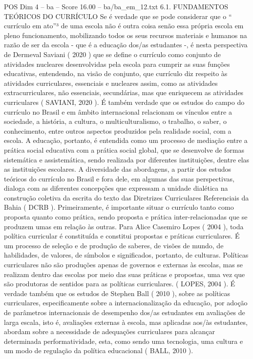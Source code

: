 \begin{textsample}{POS Dim 4 – ba – Score 16.00 – ba/ba\_em\_12.txt}  \label{ex:f4_pos_026}
6.1.
FUNDAMENTOS TEÓRICOS DO CURRÍCULO Se é verdade que se pode considerar que o “ currículo em ato”³ de uma escola não é outra coisa senão essa própria escola em pleno funcionamento, mobilizando todos os seus recursos materiais e humanos na razão de ser da escola - que é a educação dos/as estudantes -, é nesta perspectiva de Dermeval Saviani ( 2020 ) que se define o currículo como conjunto de atividades nucleares desenvolvidas pela escola para cumprir as suas funções educativas, entendendo, na visão de conjunto, que currículo diz respeito às atividades curriculares, essenciais e nucleares assim, como as atividades extracurriculares, não essenciais, secundárias, mas que enriquecem as atividades curriculares ( SAVIANI, 2020 ).
É também verdade que os estudos do campo do currículo no Brasil e em âmbito internacional relacionam os vínculos entre a sociedade, a história, a cultura, o multiculturalismo, o trabalho, o saber, o conhecimento, entre outros aspectos produzidos pela realidade social, com a escola.
A educação, portanto, é entendida como um processo de mediação entre a prática social educativa com a prática social global, que se desenvolve de formas sistemática e assistemática, sendo realizada por diferentes instituições, dentre elas as instituições escolares.
A diversidade das abordagens, a partir dos estudos teóricos do currículo no Brasil e fora dele, em algumas das suas perspectivas, dialoga com as diferentes concepções que expressam a unidade dialética na construção coletiva da escrita do texto das Diretrizes Curriculares Referenciais da Bahia ( DCRB ).
Primeiramente, é importante situar o currículo tanto como proposta quanto como prática, sendo proposta e prática inter-relacionadas que se produzem umas em relação às outras.
Para Alice Casemiro Lopes ( 2004 ), toda política curricular é constituída e constitui propostas e práticas curriculares.
É um processo de seleção e de produção de saberes, de visões de mundo, de habilidades, de valores, de símbolos e significados, portanto, de culturas.
Políticas curriculares não são produções apenas de governos e externas às escolas, mas se realizam dentro das escolas por meio das suas práticas e propostas, uma vez que são produtoras de sentidos para as políticas curriculares. ( LOPES, 2004 ).
É verdade também que os estudos de Stephen Ball ( 2010 ), sobre as políticas curriculares, especificamente sobre a internacionalização da educação, por adoção de parâmetros internacionais de desempenho dos/as estudantes em avaliações de larga escala, isto é, avaliações externas à escola, mas aplicadas aos/às estudantes, abordam sobre a necessidade de adequações curriculares para alcançar determinada performatividade, esta, como sendo uma tecnologia, uma cultura e um modo de regulação da política educacional ( BALL, 2010 ).

\end{textsample}
